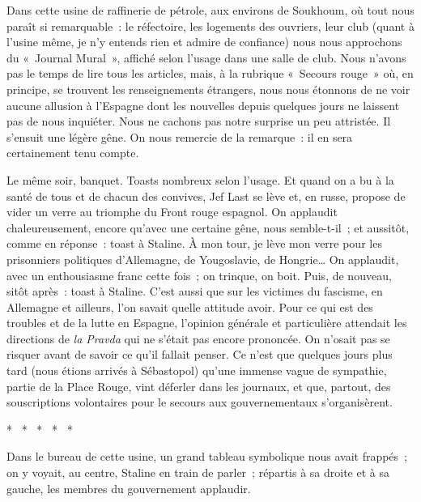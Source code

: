 \documentclass[french,twoside]{book} %
\begin{document}
\noindent Dans cette usine de raffinerie de pétrole, aux environs de Soukhoum, où tout nous paraît si remarquable : le réfectoire, les logements des ouvriers, leur club (quant à l’usine même, je n’y entends rien et admire de confiance) nous nous approchons du « Journal Mural », affiché selon l’usage dans une salle de club. Nous n’avons pas le temps de lire tous les articles, mais, à la rubrique « Secours rouge » où, en principe, se trouvent les renseignements étrangers, nous nous étonnons de ne voir aucune allusion à l’Espagne dont les nouvelles depuis quelques jours ne laissent pas de nous inquiéter. Nous ne cachons pas notre surprise un peu attristée. Il s’ensuit une légère gêne. On nous remercie de la remarque : il en sera certainement tenu compte.\par
Le même soir, banquet. Toasts nombreux selon l’usage. Et quand on a bu à la santé de tous et de chacun des convives, Jef Last se lève et, en russe, propose de vider un verre au triomphe du Front rouge espagnol. On applaudit chaleureusement, encore qu’avec une certaine gêne, nous semble-t-il ; et aussitôt, comme en réponse : toast à Staline. À mon tour, je lève mon verre pour les prisonniers politiques d’Allemagne, de Yougoslavie, de Hongrie… On applaudit, avec un enthousiasme franc cette fois ; on trinque, on boit. Puis, de nouveau, sitôt après : toast à Staline. C’est aussi que sur les victimes du fascisme, en Allemagne et ailleurs, l’on savait quelle attitude avoir. Pour ce qui est des troubles et de la lutte en Espagne, l’opinion générale et particulière attendait les directions de \emph{la Pravda} qui ne s’était pas encore prononcée. On n’osait pas se risquer avant de savoir ce qu’il fallait penser. Ce n’est que quelques jours plus tard (nous étions arrivés à Sébastopol) qu’une immense vague de sympathie, partie de la Place Rouge, vint déferler dans les journaux, et que, partout, des souscriptions volontaires pour le secours aux gouvernementaux s’organisèrent.\par

\begin{center}
\noindent \centerline{*  *  *  *  *}\par
\end{center}

\noindent Dans le bureau de cette usine, un grand tableau symbolique nous avait frappés ; on y voyait, au centre, Staline en train de parler ; répartis à sa droite et à sa gauche, les membres du gouvernement applaudir.\par
\end{document}
